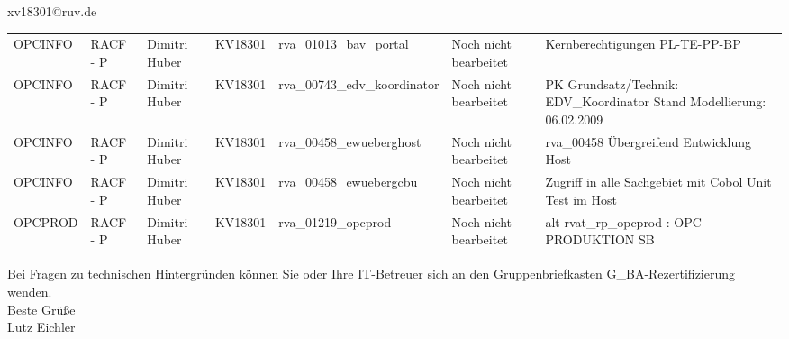 \documentclass[a4paper,landscape,12pt]{letter}
\begin{document}
\begin{letter}{xv18301@ruv.de\hfill \break}
\begin{tiny}
\begin{longtable}{|p{35mm}|p{15mm}|p{25mm}|p{10mm}|p{40mm}|p{50mm}|p{50mm}|}
OPCINFO & RACF - P & Dimitri Huber & KV18301 & rva\_01013\_bav\_portal & Noch nicht bearbeitet & Kernberechtigungen PL-TE-PP-BP \\
OPCINFO & RACF - P & Dimitri Huber & KV18301 & rva\_00743\_edv\_koordinator & Noch nicht bearbeitet & PK Grundsatz/Technik: EDV\_Koordinator Stand Modellierung: 06.02.2009 \\
OPCINFO & RACF - P & Dimitri Huber & KV18301 & rva\_00458\_ewueberghost & Noch nicht bearbeitet & rva\_00458 Übergreifend Entwicklung Host \\
OPCINFO & RACF - P & Dimitri Huber & KV18301 & rva\_00458\_ewuebergcbu & Noch nicht bearbeitet & Zugriff in alle Sachgebiet mit Cobol Unit Test im Host \\
OPCPROD & RACF - P & Dimitri Huber & KV18301 & rva\_01219\_opcprod & Noch nicht bearbeitet & alt rvat\_rp\_opcprod          : OPC-PRODUKTION                           SB \\

\hline
		\end{longtable}
		\end{tiny}
	
\begin{minipage}{\textwidth}
			Bei Fragen zu technischen Hintergründen können Sie 
			oder Ihre IT-Betreuer sich an den Gruppenbriefkasten 
			G\_BA-Rezertifizierung
			wenden.\\
			\linebreak
			Beste Grüße\\
			Lutz Eichler
	\end{minipage}
	\end{letter}
	
\end{document}
